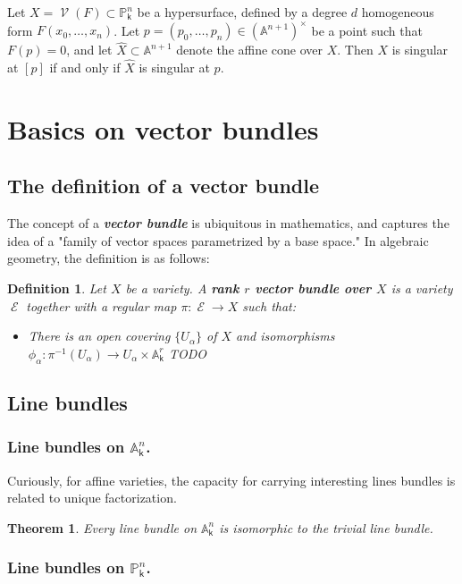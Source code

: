 \documentclass[11pt]{article}
\newcommand{\A}{\mathbb{A}}
\renewcommand{\P}{\mathbb{P}}
\renewcommand{\k}{\mathsf{k}}
\renewcommand{\to}{\longrightarrow}
\DeclareMathOperator{\V}{\mathcal{V}}
\DeclareMathOperator{\E}{\mathcal{E}}
\newcommand{\A}{\mathbb A}
\renewcommand{\k}{\mathsf{k}}
\renewcommand{\P}{\mathbb P}
\renewcommand{\to}{{\longrightarrow}}
\newtheorem{theorem}{Theorem}[section]
\newtheorem{definition}{Definition}[section]
\begin{document}
Let \(X = \V(F) \subset \P^n_{\k}\) be a hypersurface, defined by a degree \(d\) homogeneous form \(F(x_0, \dots, x_n)\).   Let \(p = (p_0, \ldots, p_n) \in \left( \A^{n+1} \right)^{\times}\) be a point such that \(F(p) = 0\), and let \(\hat{X} \subset  \A^{n+1}\) denote the affine cone over \(X\).  Then \(X\) is singular at \([p]\) if and only if \(\hat{X}\) is singular at \(p\). 
\section{Basics on vector bundles}
\label{sec:orgb9f2dba}
\subsection{The definition of a vector bundle}
\label{sec:org1133eba}
The concept of a \textbf{\emph{vector bundle}} is ubiquitous in mathematics, and captures the idea of a "family of vector spaces parametrized by a base space."  In algebraic geometry, the definition is as follows:
\begin{definition}
Let \(X\) be a variety.  A \textbf{\emph{rank \(r\) vector bundle over \(X\)}} is a variety \(\E\) together with a regular map \(\pi: \E \to X\) such that:
\begin{itemize}
\item There is an open covering \(\{U_{\alpha}\}\) of \(X\)  and isomorphisms \(\phi_{\alpha}: \pi^{-1}(U_{\alpha}) \to U_{\alpha}\times \A^r_{\k}\) TODO
\end{itemize}
\end{definition}
\subsection{Line bundles}
\label{sec:orge6090c9}
\subsubsection{Line bundles on \(\A^n_{\k}\).}
\label{sec:orgb41e603}
Curiously, for affine varieties, the capacity for carrying interesting lines bundles is related to unique factorization.
\begin{theorem}
Every line bundle on \(\A^{n}_{\k}\) is isomorphic to the trivial line bundle.
\end{theorem}
\subsubsection{Line bundles on \(\P^n_{\k}\).}
\label{sec:org86c17e6}
\end{document}
